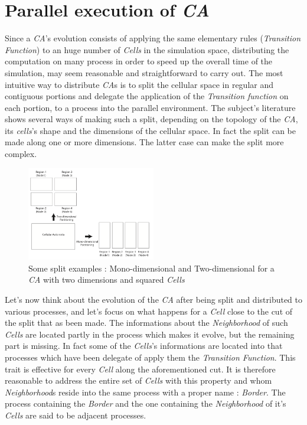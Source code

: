 \documentclass[12pt,a4paper,fleqn]{report}
\begin{document}
\section{Parallel execution of \textit{CA}}
Since a \textit{CA}'s evolution consists of applying the same elementary rules (\textit{Transition Function}) to an huge number of \textit{Cells} in the simulation space, distributing the computation on many process in order to speed up the overall time of the simulation, may seem reasonable and straightforward to carry out. The most intuitive way to distribute \textit{CA}s is to split the cellular space in regular and contiguous portions and delegate the application of the \textit{Transition function} on each portion, to a process into the parallel environment. The subject's literature shows several ways of making such a split, depending on the topology of the \textit{CA}, its \textit{cells}'s shape and the dimensions of the cellular space. In fact the split can be made along one or more dimensions. The latter case can make the split more complex.

\begin{figure}[ht!]
\centering
    \includegraphics[width=0.5\textwidth]{split_types}
    \caption{  Some split examples : Mono-dimensional and Two-dimensional for a \textit{CA} with two dimensions and squared \textit{Cells} \cite{1}}
\end{figure}

Let's now think about the evolution of the \textit{CA} after being split and distributed to various processes, and let's focus on what happens for a \textit{Cell} close to the cut of the split that as been made. The informations about the \textit{Neighborhood} of such \textit{Cells} are located partly in the process which makes it evolve, but the remaining part is missing. In fact some of the \textit{Cells}'s  informations are located into that processes which have been delegate of apply them the \textit{Transition Function}. This trait is effective for every \textit{Cell} along the aforementioned cut. It is therefore reasonable to address the entire set of \textit{Cells} with this property and whom \textit{Neighborhood}s reside into the same process with a proper name : \textit{Border}. The process containing the \textit{Border} and the one containing the \textit{Neighborhood} of it's \textit{Cells} are said to be adjacent processes. 
\end{document}
